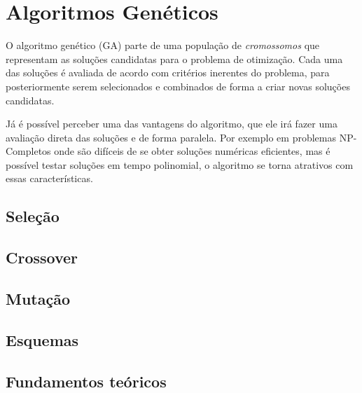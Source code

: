 
\chapter{Algoritmos Genéticos}
\label{chap:GA}

O algoritmo genético (GA) parte de uma população de \textit{cromossomos} que representam as soluções candidatas para o problema de otimização. Cada uma das soluções é avaliada de acordo com critérios inerentes do problema, para posteriormente serem selecionados e combinados de forma a criar novas soluções candidatas.

Já é possível perceber uma das vantagens do algoritmo, que ele irá fazer uma avaliação direta das soluções e de forma paralela. Por exemplo em problemas NP-Completos onde são difíceis de se obter soluções numéricas eficientes, mas é possível testar soluções em tempo polinomial, o algoritmo se torna atrativos com essas características.

\section{Seleção}

\section{Crossover}

\section{Mutação}

\section{Esquemas}

\section{Fundamentos teóricos}